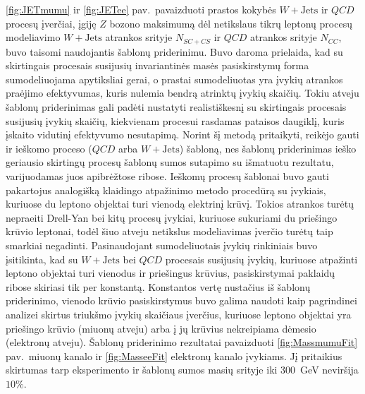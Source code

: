 \documentclass[a4paper, 12pt, oneside]{article}
\newcommand{\WJets}{W\! +\!\mathrm{Jets}}
\newcommand{\QCD}{QC\! D}
\begin{document}
\ref{fig:JETmumu} ir \ref{fig:JETee} pav.\ pavaizduoti prastos kokybės $\WJets$ ir $\QCD$ procesų įverčiai, įgiję $Z$ bozono
maksimumą dėl netikslaus tikrų leptonų procesų modeliavimo $\WJets$ atrankos srityje $N_{SC+CS}$ ir $\QCD$ atrankos srityje
$N_{CC}$, buvo taisomi naudojantis šablonų priderinimu.
Buvo daroma prielaida, kad su skirtingais procesais susijusių invariantinės masės pasiskirstymų forma sumodeliuojama
apytiksliai gerai, o prastai sumodeliuotas yra įvykių atrankos praėjimo efektyvumas, kuris nulemia bendrą atrinktų įvykių skaičių.
Tokiu atveju šablonų priderinimas gali padėti nustatyti realistiškesnį su skirtingais procesais susijusių įvykių skaičių,
kiekvienam procesui rasdamas pataisos daugiklį, kuris įskaito vidutinį efektyvumo nesutapimą.
Norint šį metodą pritaikyti, reikėjo gauti ir ieškomo proceso ($\QCD$ arba $\WJets$) šabloną, nes šablonų priderinimas
ieško geriausio skirtingų procesų šablonų sumos sutapimo su išmatuotu rezultatu, varijuodamas juos apibrėžtose ribose.
Ieškomų procesų šablonai buvo gauti pakartojus analogišką klaidingo atpažinimo metodo procedūrą su įvykiais, kuriuose du
leptono objektai turi vienodą elektrinį krūvį.
Tokios atrankos turėtų nepraeiti Drell-Yan bei kitų procesų įvykiai, kuriuose sukuriami du priešingo krūvio leptonai, todėl šiuo
atveju netikslus modeliavimas įverčio turėtų taip smarkiai negadinti.
Pasinaudojant sumodeliuotais įvykių rinkiniais buvo įsitikinta, kad su $\WJets$ bei $\QCD$ procesais susijusių įvykių, kuriuose
atpažinti leptono objektai turi vienodus ir priešingus krūvius, pasiskirstymai paklaidų ribose skiriasi tik per konstantą.
Konstantos vertę nustačius iš šablonų priderinimo, vienodo krūvio pasiskirstymus buvo galima naudoti kaip pagrindinei analizei skirtus
triukšmo įvykių skaičiaus įverčius, kuriuose leptono objektai yra priešingo krūvio (miuonų atveju) arba į jų krūvius nekreipiama
dėmesio (elektronų atveju).
Šablonų priderinimo rezultatai pavaizduoti \ref{fig:MassmumuFit} pav.\ miuonų kanalo ir \ref{fig:MasseeFit} elektronų kanalo įvykiams.
Jį pritaikius skirtumas tarp eksperimento ir šablonų sumos masių srityje iki $300$~GeV neviršija $10\%$.
\end{document}
